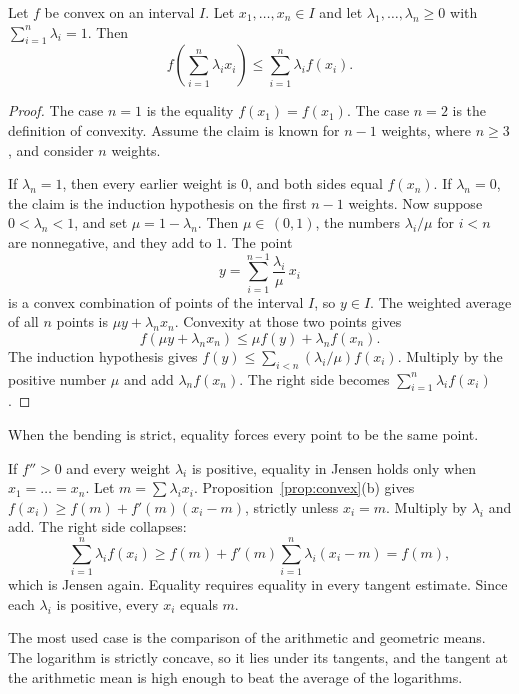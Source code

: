 \begin{theorem}[Jensen]\label{thm:jensen}
Let $f$ be convex on an interval $I$. Let $x_1,\dots,x_n\in I$ and let $\lambda_1,\dots,\lambda_n\ge0$ with $\sum_{i=1}^n\lambda_i=1$. Then
\[
f\left(\sum_{i=1}^n\lambda_ix_i\right)\le\sum_{i=1}^n\lambda_if(x_i).
\]
\end{theorem}
\begin{proof}
The case $n=1$ is the equality $f(x_1)=f(x_1)$. The case $n=2$ is the definition of convexity. Assume the claim is known for $n-1$ weights, where $n\ge3$, and consider $n$ weights.

If $\lambda_n=1$, then every earlier weight is $0$, and both sides equal $f(x_n)$. If $\lambda_n=0$, the claim is the induction hypothesis on the first $n-1$ weights. Now suppose $0<\lambda_n<1$, and set $\mu=1-\lambda_n$. Then $\mu\in\,(0,1)$, the numbers $\lambda_i/\mu$ for $i<n$ are nonnegative, and they add to $1$. The point
\[
y=\sum_{i=1}^{n-1}\frac{\lambda_i}{\mu}\,x_i
\]
is a convex combination of points of the interval $I$, so $y\in I$. The weighted average of all $n$ points is $\mu y+\lambda_nx_n$. Convexity at those two points gives
\[
f(\mu y+\lambda_nx_n)\le\mu f(y)+\lambda_nf(x_n).
\]
The induction hypothesis gives $f(y)\le\sum_{i<n}(\lambda_i/\mu)f(x_i)$. Multiply by the positive number $\mu$ and add $\lambda_nf(x_n)$. The right side becomes $\sum_{i=1}^n\lambda_if(x_i)$.
\end{proof}

When the bending is strict, equality forces every point to be the same point.

If $f''>0$ and every weight $\lambda_i$ is positive, equality in Jensen holds only when $x_1=\dots=x_n$. Let $m=\sum\lambda_ix_i$. Proposition~\ref{prop:convex}(b) gives $f(x_i)\ge f(m)+f'(m)(x_i-m)$, strictly unless $x_i=m$. Multiply by $\lambda_i$ and add. The right side collapses:
\[
\sum_{i=1}^n\lambda_if(x_i)\ge f(m)+f'(m)\sum_{i=1}^n\lambda_i(x_i-m)=f(m),
\]
which is Jensen again. Equality requires equality in every tangent estimate. Since each $\lambda_i$ is positive, every $x_i$ equals $m$.

The most used case is the comparison of the arithmetic and geometric means. The logarithm is strictly concave, so it lies under its tangents, and the tangent at the arithmetic mean is high enough to beat the average of the logarithms.

